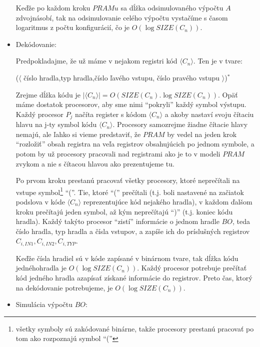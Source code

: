 \begin{dokaz}
\begin{itemize}
    Keďže po každom kroku $PRAMu$ sa dĺžka odsimulovaného výpočtu $A$
    zdvojnásobí, tak na odsimulovanie celého výpočtu vystačíme s
    časom logaritmus z počtu konfigurácií, čo je $O(\log
    SIZE(C_n))$.

    \item Dekódovanie:

    Predpokladajme, že už máme v nejakom registri kód $\langle C_n\rangle$. Ten
    je v tvare:

     \centerline{
    ($\langle$ číslo hradla,typ hradla,číslo ľavého vstupu, číslo
    pravého vstupu $\rangle$)$^*$}
    Zrejme dĺžka kódu je $|\langle C_n\rangle |=O(SIZE(C_n).
    \log SIZE(C_n))$. Opäť máme dostatok procesorov, aby sme nimi
    ``pokryli'' každý symbol výstupu. Každý procesor $P_j$ načíta
    register s kódom $\langle C_n\rangle$ a akoby nastaví svoju čítaciu
    hlavu na j-ty symbol kódu $\langle C_n\rangle$. Procesory samozrejme žiadne
    čítacie hlavy nemajú, ale ľahko si vieme predstaviť, že $PRAM$ by
    vedel na jeden krok ``rozložiť'' obsah registra na veľa registrov
    obsahujúcich po jednom symbole, a potom by už procesory pracovali
    nad registrami ako je to v modeli $PRAM$ zvykom a nie s čítacou
    hlavou ako prezentujeme tu.

    Po prvom kroku prestanú pracovať všetky procesory, ktoré
    neprečítali na vstupe symbol\footnote{všetky symboly sú zakódované
    binárne, takže procesory prestanú pracovať po tom ako rozpoznajú
    symbol ``(''} ``(''. Tie, ktoré ``('' prečítali
    (t.j. boli nastavené na začiatok podslova v kóde $\langle C_n\rangle$
    reprezentujúce kód nejakého hradla), v každom ďalšom kroku
    prečítajú jeden symbol, až kým neprečítajú ``)'' (t.j. koniec
    kódu hradla). Každý takýto procesor ``zistí'' informácie o
    jednom hradle $BO$, teda číslo hradla, typ hradla a čísla
    vstupov, a zapíše ich do príslušných registrov $C_{i,IN1},
    C_{i,IN2}, C_{i,TYP}$.

    Keďže čísla hradiel sú v kóde zapísané v binárnom tvare, tak
    dĺžka kódu jedného\linebreak hradla je $O(\log SIZE(C_n))$. Každý procesor
    potrebuje prečítať kód jedného hradla a\linebreak zapísať získané
    informácie do registrov. Preto čas, ktorý na dekódovanie
    potrebujeme, je $O(\log SIZE(C_n))$.

    \item Simulácia výpočtu $BO$:


\end{itemize}
\end{dokaz}
